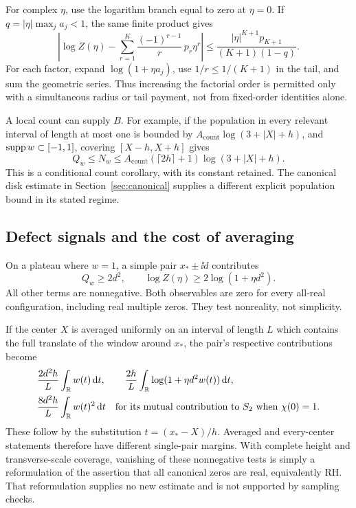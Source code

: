 For complex $\eta$, use the logarithm branch equal to zero at $\eta=0$.
If $q=|\eta|\max_j a_j<1$, the same finite product gives
\begin{equation}\label{eq:complex-log-tail}
 \left|\log Z(\eta)-
       \sum_{r=1}^K\frac{(-1)^{r-1}}r\,p_r\eta^r\right|
 \le
 \frac{|\eta|^{K+1}p_{K+1}}{(K+1)(1-q)} .
\end{equation}
For each factor, expand $\log(1+\eta a_j)$, use
$1/r\le1/(K+1)$ in the tail, and sum the geometric series.
Thus increasing the factorial order is permitted only with a
simultaneous radius or tail payment, not from fixed-order identities
alone.

A local count can supply $B$. For example, if the population in
every relevant interval of length at most one is bounded by
$A_{\mathrm{count}}\log(3+|X|+h)$, and
$\operatorname{supp} w\subset[-1,1]$, covering $[X-h,X+h]$ gives
\[
 Q_w\le N_w\le
 A_{\mathrm{count}}(\lceil2h\rceil+1)\log(3+|X|+h).
\]
This is a conditional count corollary, with its constant retained.
The canonical disk estimate in Section~\ref{sec:canonical} supplies a
different explicit population bound in its stated regime.

\subsection{Defect signals and the cost of averaging}

On a plateau where $w=1$, a simple pair $x_*\pm\ii d$ contributes
\begin{equation}\label{eq:scalar-signals}
 Q_w\ge2d^2,\qquad
 \log Z(\eta)\ge2\log(1+\eta d^2).
\end{equation}
All other terms are nonnegative. Both observables are zero for every
all-real configuration, including real multiple zeros. They test
nonreality, not simplicity.

If the center $X$ is averaged uniformly on an interval of length $L$
which contains the full translate of the window around $x_*$, the
pair's respective contributions become
\begin{align}
 &\frac{2d^2h}{L}\int_\mathbb R w(t)\,\mathrm d t,\qquad
 \frac{2h}{L}\int_\mathbb R\log(1+\eta d^2w(t))\,\mathrm d t,\label{eq:average-scalar}\\
 &\frac{8d^2h}{L}\int_\mathbb R w(t)^2\,\mathrm d t
       \quad\text{for its mutual contribution to }S_2
       \text{ when }\chi(0)=1 .\notag
\end{align}
These follow by the substitution $t=(x_*-X)/h$.
Averaged and every-center statements therefore have different
single-pair margins. With complete height and transverse-scale
coverage, vanishing of these nonnegative tests is simply a
reformulation of the assertion that all canonical zeros are real,
equivalently RH. That reformulation supplies no new estimate and is
not supported by sampling checks.
